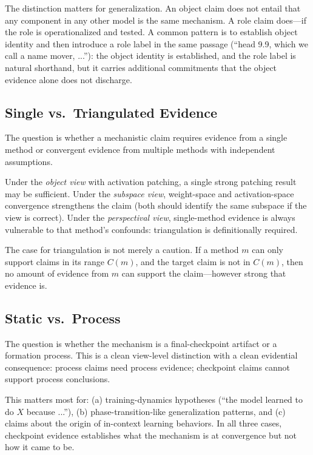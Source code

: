 \documentclass{article}
\begin{document}
The distinction matters for generalization.  An object claim does not
entail that any component in any other model is the same mechanism.  A
role claim does---if the role is operationalized and tested.  A common pattern is to establish object identity and then introduce a
role label in the same passage (``head 9.9, which we call a name
mover, ...''): the object identity is established, and the role label
is natural shorthand, but it carries additional commitments that the
object evidence alone does not discharge.

\subsection{Single vs.\ Triangulated Evidence}

The question is whether a mechanistic claim requires evidence from a
single method or convergent evidence from multiple methods with
independent assumptions.

Under the \emph{object view} with activation patching, a single strong
patching result may be sufficient.  Under the \emph{subspace view},
weight-space and activation-space convergence strengthens the claim
(both should identify the same subspace if the view is correct).
Under the \emph{perspectival view}, single-method evidence is always
vulnerable to that method's confounds: triangulation is definitionally
required.

The case for triangulation is not merely a caution.  If a method $m$
can only support claims in its range $C(m)$, and the target claim is
not in $C(m)$, then no amount of evidence from $m$ can support the
claim---however strong that evidence is.

\subsection{Static vs.\ Process}

The question is whether the mechanism is a final-checkpoint artifact
or a formation process.  This is a clean view-level distinction with
a clean evidential consequence: process claims need process evidence;
checkpoint claims cannot support process conclusions.

This matters most for: (a) training-dynamics hypotheses (``the model
learned to do $X$ because ...''), (b) phase-transition-like generalization
patterns, and (c) claims about the origin of in-context learning
behaviors.  In all three cases, checkpoint evidence establishes what
the mechanism is at convergence but not how it came to be.
\end{document}
